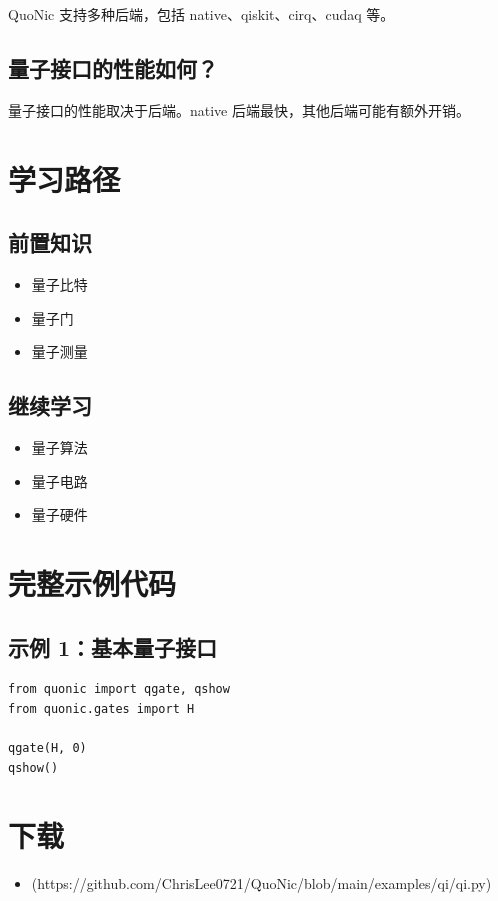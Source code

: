 \documentclass[12pt,a4paper]{article}
\begin{document}
QuoNic 支持多种后端，包括 native、qiskit、cirq、cudaq 等。

\subsection{量子接口的性能如何？}

量子接口的性能取决于后端。native 后端最快，其他后端可能有额外开销。

\section{学习路径}

\subsection{前置知识}
\begin{itemize}
  \item 量子比特
  \item 量子门
  \item 量子测量
\end{itemize}

\subsection{继续学习}
\begin{itemize}
  \item 量子算法
  \item 量子电路
  \item 量子硬件
\end{itemize}

\section{完整示例代码}

\subsection{示例 1：基本量子接口}

\begin{verbatim}
from quonic import qgate, qshow
from quonic.gates import H

qgate(H, 0)
qshow()
\end{verbatim}

\section{下载}

\begin{itemize}
  \item [qi.py](https://github.com/ChrisLee0721/QuoNic/blob/main/examples/qi/qi.py)
\end{itemize}
\end{document}
